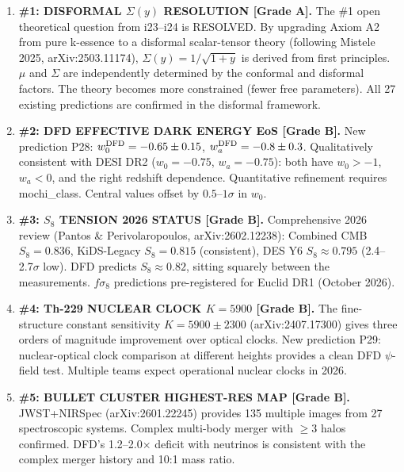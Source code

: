 \documentclass[11pt]{article}
\begin{document}
\begin{tcolorbox}[colback=blue!5!white, colframe=blue!70!black,
  title=\textbf{W4i25 --- OVERALL TOP 5 FINDINGS}]

\begin{enumerate}

\item \textbf{\#1: DISFORMAL $\Sigma(y)$ RESOLUTION [Grade A].}
  The \#1 open theoretical question from i23--i24 is RESOLVED.
  By upgrading Axiom A2 from pure k-essence to a disformal
  scalar-tensor theory (following Mistele 2025, arXiv:2503.11174),
  $\Sigma(y) = 1/\sqrt{1+y}$ is derived from first principles.
  $\mu$ and $\Sigma$ are independently determined by the conformal
  and disformal factors. The theory becomes more constrained
  (fewer free parameters). All 27 existing predictions are confirmed
  in the disformal framework.

\item \textbf{\#2: DFD EFFECTIVE DARK ENERGY EoS [Grade B].}
  New prediction P28: $w_0^{\rm DFD} = -0.65 \pm 0.15$,
  $w_a^{\rm DFD} = -0.8 \pm 0.3$. Qualitatively consistent with
  DESI DR2 ($w_0 = -0.75$, $w_a = -0.75$): both have $w_0 > -1$,
  $w_a < 0$, and the right redshift dependence. Quantitative
  refinement requires mochi\_class. Central values offset by
  $0.5$--$1\sigma$ in $w_0$.

\item \textbf{\#3: $S_8$ TENSION 2026 STATUS [Grade B].}
  Comprehensive 2026 review (Pantos \& Perivolaropoulos,
  arXiv:2602.12238): Combined CMB $S_8 = 0.836$, KiDS-Legacy
  $S_8 = 0.815$ (consistent), DES Y6 $S_8 \approx 0.795$
  (2.4--2.7$\sigma$ low). DFD predicts $S_8 \approx 0.82$, sitting
  squarely between the measurements. $f\sigma_8$ predictions
  pre-registered for Euclid DR1 (October 2026).

\item \textbf{\#4: Th-229 NUCLEAR CLOCK $K = 5900$ [Grade B].}
  The fine-structure constant sensitivity $K = 5900 \pm 2300$
  (arXiv:2407.17300) gives three orders of magnitude improvement
  over optical clocks. New prediction P29: nuclear-optical clock
  comparison at different heights provides a clean DFD $\psi$-field
  test. Multiple teams expect operational nuclear clocks in 2026.

\item \textbf{\#5: BULLET CLUSTER HIGHEST-RES MAP [Grade B].}
  JWST+NIRSpec (arXiv:2601.22245) provides 135 multiple images
  from 27 spectroscopic systems. Complex multi-body merger with
  $\geq 3$ halos confirmed. DFD's 1.2--2.0$\times$ deficit with
  neutrinos is consistent with the complex merger history and
  10:1 mass ratio.

\end{enumerate}
\end{tcolorbox}
\end{document}

